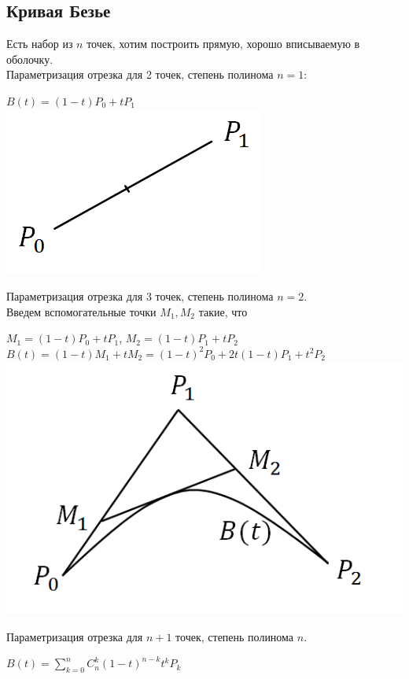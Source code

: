 \subsection{Кривая Безье}
Есть набор из $n$ точек, хотим построить прямую, хорошо вписываемую в оболочку.\\
Параметризация отрезка для 2 точек, степень полинома $n = 1$:
\begin{center}
    $B(t) = (1-t)P_0+tP_1$\\
    \includegraphics[scale=0.5]{l3_7.png}\end{center}
Параметризация отрезка для 3 точек, степень полинома $n = 2$.\\
Введем вспомогательные точки $M_1, M_2$ такие, что \begin{center}$M_1 = (1-t)P_0+tP_1$, $M_2 = (1-t)P_1+tP_2$\\
    $B(t) = (1-t)M_1+tM_2 = (1-t)^2P_0+2t(1-t)P_1+t^2P_2$\\
    \includegraphics[scale=0.5]{l3_8.png}\end{center}
Параметризация отрезка для $n+1$ точек, степень полинома $n$.
\begin{center}$B(t) = \sum\limits_{k=0}^n C_n^k (1-t)^{n-k}t^kP_k$\end{center}
